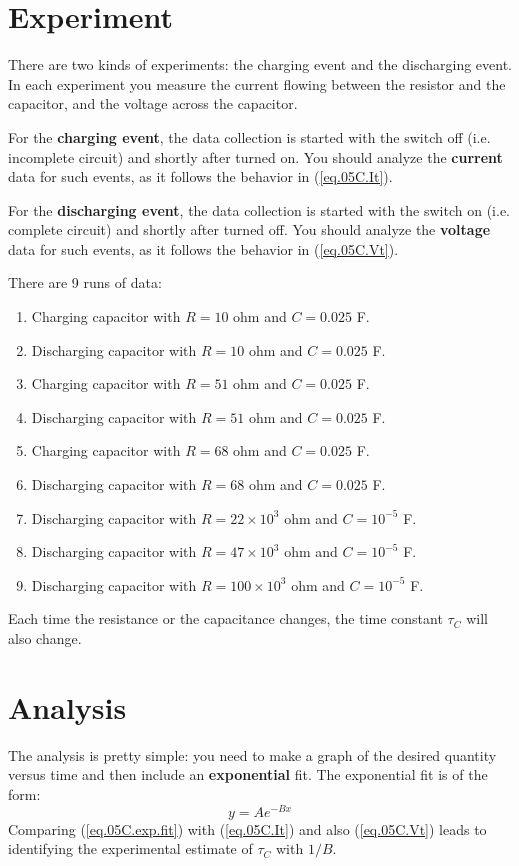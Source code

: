 \section{Experiment}
%
There are two kinds of experiments: the charging event and the discharging event. In each experiment you measure the current flowing between the resistor and the capacitor, and the voltage across the capacitor.

For the \textbf{charging event}, the data collection is started with the switch off (i.e. incomplete circuit) and shortly after turned on. You should analyze the \textbf{current} data for such events, as it follows the behavior in (\ref{eq.05C.It}).

For the \textbf{discharging event}, the data collection is started with the switch on (i.e. complete circuit) and shortly after turned off. You should analyze the \textbf{voltage} data for such events, as it follows the behavior in (\ref{eq.05C.Vt}).

There are 9 runs of data:
\begin{enumerate}
	\item Charging capacitor with $R = 10$ ohm and $C = 0.025$ F.
	\item Discharging capacitor with $R = 10$ ohm and $C = 0.025$ F.
	\item Charging capacitor with $R = 51$ ohm and $C = 0.025$ F.
	\item Discharging capacitor with $R = 51$ ohm and $C = 0.025$ F.
	\item Charging capacitor with $R = 68$ ohm and $C = 0.025$ F.
	\item Discharging capacitor with $R = 68$ ohm and $C = 0.025$ F.
	\item Discharging capacitor with $R = 22 \times 10^{3}$ ohm and $C = 10^{-5}$ F.
	\item Discharging capacitor with $R = 47 \times 10^{3}$ ohm and $C = 10^{-5}$ F.
	\item Discharging capacitor with $R = 100 \times 10^{3}$ ohm and $C = 10^{-5}$ F.
\end{enumerate}
Each time the resistance or the capacitance changes, the time constant $\tau_{C}$ will also change.
%
\section{Analysis}
%
The analysis is pretty simple: you need to make a graph of the desired quantity versus time and then include an \textbf{exponential} fit. The exponential fit is of the form:
\begin{equation}
	y = A e^{-Bx}
	\label{eq.05C.exp.fit}
\end{equation}
Comparing (\ref{eq.05C.exp.fit}) with (\ref{eq.05C.It}) and also (\ref{eq.05C.Vt}) leads to identifying the experimental estimate of $\tau_{C}$ with $1 / B$.

